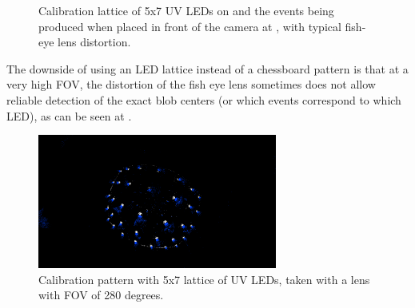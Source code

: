\begin{figure}[H]
	\centering
	\caption{
		Calibration lattice of 5x7 UV LEDs on  and the events being produced when placed in front of the camera at ,
		with typical fish-eye lens distortion.
  }
	\label{fig:lattice}
\end{figure}
The downside of using an LED lattice instead of a chessboard pattern is that at a very high FOV, the distortion of the fish eye lens sometimes does not allow
reliable detection of the exact blob centers (or which events correspond to which LED), as can be seen at .
\begin{figure}[H]
  \centering
  \includegraphics[width=0.7\textwidth]{./fig/photos/lattice_280.png}
  \caption{Calibration pattern with 5x7 lattice of UV LEDs, taken with a lens with FOV of 280 degrees.}
  \label{fig:calibration_pattern_distorted}
\end{figure}


